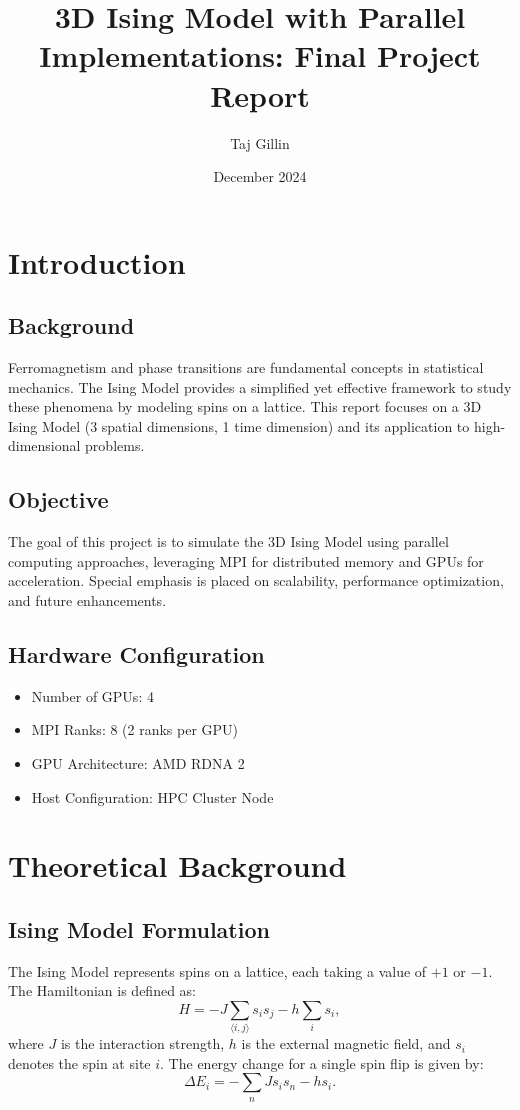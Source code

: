 \documentclass{article}
\title{3D Ising Model with Parallel Implementations: Final Project Report}
\author{Taj Gillin}
\date{December 2024}
\begin{document}
\maketitle

\tableofcontents
\newpage

\section{Introduction}
\subsection{Background}
Ferromagnetism and phase transitions are fundamental concepts in statistical mechanics. The Ising Model provides a simplified yet effective framework to study these phenomena by modeling spins on a lattice. This report focuses on a 3D Ising Model (3 spatial dimensions, 1 time dimension) and its application to high-dimensional problems.

\subsection{Objective}
The goal of this project is to simulate the 3D Ising Model using parallel computing approaches, leveraging MPI for distributed memory and GPUs for acceleration. Special emphasis is placed on scalability, performance optimization, and future enhancements.

\subsection{Hardware Configuration}
\begin{itemize}
    \item Number of GPUs: 4
    \item MPI Ranks: 8 (2 ranks per GPU)
    \item GPU Architecture: AMD RDNA 2
    \item Host Configuration: HPC Cluster Node
\end{itemize}

\section{Theoretical Background}
\subsection{Ising Model Formulation}
The Ising Model represents spins on a lattice, each taking a value of $+1$ or $-1$. The Hamiltonian is defined as:
\begin{equation}
H = -J \sum_{\langle i,j \rangle} s_i s_j - h \sum_i s_i,
\end{equation}
where $J$ is the interaction strength, $h$ is the external magnetic field, and $s_i$ denotes the spin at site $i$. The energy change for a single spin flip is given by:
\begin{equation}
\Delta E_i = -\sum_n J s_i s_n - h s_i.
\end{equation}
\end{document}
